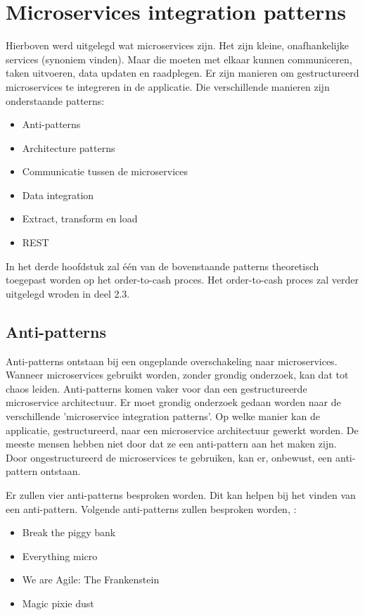 \section{Microservices integration patterns}
Hierboven werd uitgelegd wat microservices zijn. Het zijn kleine, onafhankelijke services (synoniem vinden). Maar die moeten met elkaar kunnen communiceren, taken uitvoeren, data updaten en raadplegen. Er zijn manieren om gestructureerd microservices te integreren in de applicatie.
Die verschillende manieren zijn onderstaande patterns:
\begin{itemize}
	\item Anti-patterns
	\item Architecture patterns
	\item Communicatie tussen de microservices
	\item Data integration
	\item Extract, transform en load
	\item REST	
\end{itemize}

In het derde hoofdstuk zal één van de bovenstaande patterns theoretisch toegepast worden op het order-to-cash proces. Het order-to-cash proces zal verder uitgelegd wroden in deel 2.3.
\subsection{Anti-patterns}
Anti-patterns ontstaan bij een ongeplande overschakeling naar microservices. Wanneer microservices gebruikt worden, zonder grondig onderzoek, kan dat tot chaos leiden. Anti-patterns komen vaker voor dan een gestructureerde microservice architectuur. Er moet grondig onderzoek gedaan worden naar de verschillende 'microservice integration patterns'. Op welke manier kan de applicatie, gestructureerd, naar een microservice architectuur gewerkt worden.
De meeste mensen hebben niet door dat ze een anti-pattern aan het maken zijn. Door ongestructureerd de microservices te gebruiken, kan er, onbewust, een anti-pattern ontstaan. 

Er zullen vier anti-patterns besproken worden. Dit kan helpen bij het vinden van een anti-pattern. Volgende anti-patterns zullen besproken worden, \textcite{Monson2019}:
\begin{itemize}
	\item Break the piggy bank
	\item Everything micro
	\item We are Agile: The Frankenstein
	\item Magic pixie dust
\end{itemize}
